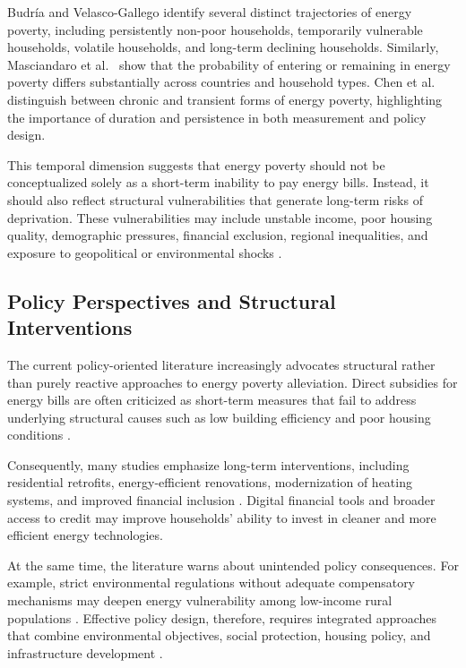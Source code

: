 \documentclass[11pt,a4paper]{article}
\begin{document}
Budr\'ia and Velasco-Gallego \cite{BUDRIA2026104670} identify several distinct trajectories of energy poverty, including persistently non-poor households, temporarily vulnerable households, volatile households, and long-term declining households. Similarly, Masciandaro et al.~\cite{MASCIANDARO2026115318} show that the probability of entering or remaining in energy poverty differs substantially across countries and household types. Chen et al.~\cite{CHEN2026109339} distinguish between chronic and transient forms of energy poverty, highlighting the importance of duration and persistence in both measurement and policy design.

This temporal dimension suggests that energy poverty should not be conceptualized solely as a short-term inability to pay energy bills. Instead, it should also reflect structural vulnerabilities that generate long-term risks of deprivation. These vulnerabilities may include unstable income, poor housing quality, demographic pressures, financial exclusion, regional inequalities, and exposure to geopolitical or environmental shocks \cite{ULLAH2026115185,ALI2026115278}.

\subsection{Policy Perspectives and Structural Interventions}

The current policy-oriented literature increasingly advocates structural rather than purely reactive approaches to energy poverty alleviation. Direct subsidies for energy bills are often criticized as short-term measures that fail to address underlying structural causes such as low building efficiency and poor housing conditions \cite{perez2023retro,jansen2022subsidies}.

Consequently, many studies emphasize long-term interventions, including residential retrofits, energy-efficient renovations, modernization of heating systems, and improved financial inclusion \cite{zhang2022fintech,okocha2023mobilemoney}. Digital financial tools and broader access to credit may improve households' ability to invest in cleaner and more efficient energy technologies.

At the same time, the literature warns about unintended policy consequences. For example, strict environmental regulations without adequate compensatory mechanisms may deepen energy vulnerability among low-income rural populations \cite{liu2021straw,zhao2022unintended}. Effective policy design, therefore, requires integrated approaches that combine environmental objectives, social protection, housing policy, and infrastructure development \cite{kone2023sez}.
\end{document}
